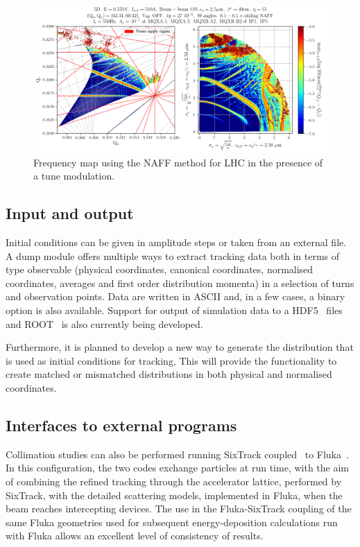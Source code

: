 \documentclass[a4paper,
              ]{jacow}
\begin{document}
\begin{figure}[!tbh]
\centering
 \includegraphics[width=\textwidth]{FMA.png}
 \caption{Frequency map using the NAFF method for LHC in the presence of a tune modulation.}
 \label{fig:fma}
\end{figure}

\subsection{Input and output}

Initial conditions can be given in amplitude steps or taken from an external file. A dump module offers multiple ways to extract tracking data both in terms of type observable (physical coordinates, canonical coordinates, normalised coordinates, averages and first order distribution momenta) in a selection of turns and observation points. Data are written in ASCII and, in a few cases, a binary option is also available. Support for output of simulation data to a HDF5~\cite{hdf5} files and ROOT~\cite{root} is also currently being developed.

Furthermore, it is planned to develop a new way to generate the distribution that is used as initial conditions for tracking. This will provide the functionality to create matched or mismatched distributions in both physical and normalised coordinates.

\subsection{Interfaces to external programs}

Collimation studies can also be performed running SixTrack coupled~\cite{flukaCouplingVV} to Fluka~\cite{FLUKA1,FLUKA2}. In this configuration, the two codes exchange particles at run time, with the aim of combining the refined tracking through the accelerator lattice, performed by SixTrack, with the detailed scattering models, implemented in Fluka, when the beam reaches intercepting devices. The use in the Fluka-SixTrack coupling of the same Fluka geometries used for subsequent energy-deposition calculations run with Fluka allows an excellent level of consistency of results.
\end{document}
